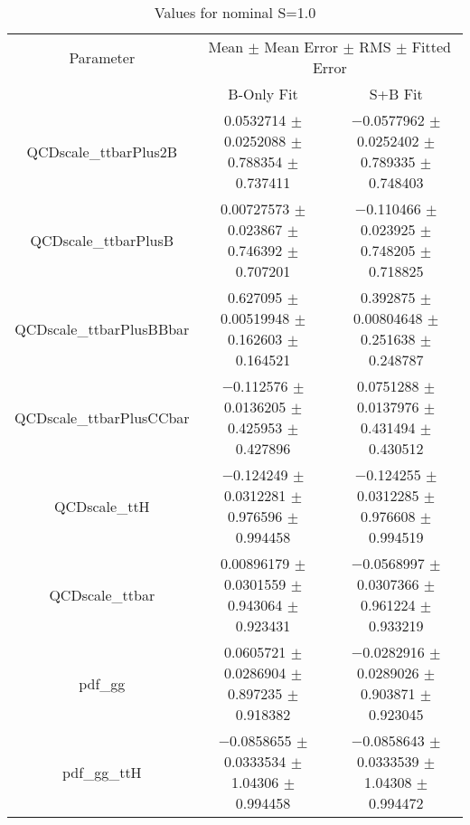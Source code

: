\begin{table}
\centering
\caption{Values for nominal S=1.0}
\begin{tabular}{ccc}
\toprule
Parameter & \multicolumn{2}{c}{Mean $\pm$ Mean Error $\pm$ RMS $\pm$ Fitted Error}\\
 & B-Only Fit & S+B Fit\\
\midrule
QCDscale\_ttbarPlus2B & \num{0.0532714} $\pm$ \num{0.0252088} $\pm$ \num{0.788354} $\pm$ \num{0.737411} & \num{-0.0577962} $\pm$ \num{0.0252402} $\pm$ \num{0.789335} $\pm$ \num{0.748403}\\
QCDscale\_ttbarPlusB & \num{0.00727573} $\pm$ \num{0.023867} $\pm$ \num{0.746392} $\pm$ \num{0.707201} & \num{-0.110466} $\pm$ \num{0.023925} $\pm$ \num{0.748205} $\pm$ \num{0.718825}\\
QCDscale\_ttbarPlusBBbar & \num{0.627095} $\pm$ \num{0.00519948} $\pm$ \num{0.162603} $\pm$ \num{0.164521} & \num{0.392875} $\pm$ \num{0.00804648} $\pm$ \num{0.251638} $\pm$ \num{0.248787}\\
QCDscale\_ttbarPlusCCbar & \num{-0.112576} $\pm$ \num{0.0136205} $\pm$ \num{0.425953} $\pm$ \num{0.427896} & \num{0.0751288} $\pm$ \num{0.0137976} $\pm$ \num{0.431494} $\pm$ \num{0.430512}\\
QCDscale\_ttH & \num{-0.124249} $\pm$ \num{0.0312281} $\pm$ \num{0.976596} $\pm$ \num{0.994458} & \num{-0.124255} $\pm$ \num{0.0312285} $\pm$ \num{0.976608} $\pm$ \num{0.994519}\\
QCDscale\_ttbar & \num{0.00896179} $\pm$ \num{0.0301559} $\pm$ \num{0.943064} $\pm$ \num{0.923431} & \num{-0.0568997} $\pm$ \num{0.0307366} $\pm$ \num{0.961224} $\pm$ \num{0.933219}\\
pdf\_gg & \num{0.0605721} $\pm$ \num{0.0286904} $\pm$ \num{0.897235} $\pm$ \num{0.918382} & \num{-0.0282916} $\pm$ \num{0.0289026} $\pm$ \num{0.903871} $\pm$ \num{0.923045}\\
pdf\_gg\_ttH & \num{-0.0858655} $\pm$ \num{0.0333534} $\pm$ \num{1.04306} $\pm$ \num{0.994458} & \num{-0.0858643} $\pm$ \num{0.0333539} $\pm$ \num{1.04308} $\pm$ \num{0.994472}\\
\bottomrule
\end{tabular}
\end{table}